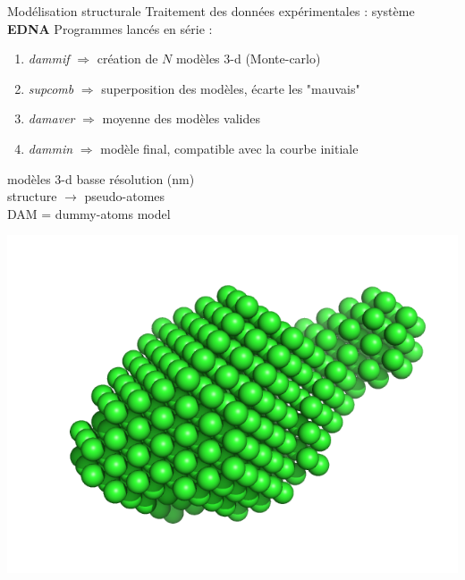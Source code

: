 \documentclass{beamer}
\begin{document}
\begin{frame}{Mod\'elisation structurale}
Traitement des donn\'ees exp\'erimentales : syst\`eme \textbf{EDNA}
Programmes lanc\'es en s\'erie : 
\begin{enumerate}
  \item \textit{dammif} $\Rightarrow$ cr\'eation de $N$ mod\`eles 3-d 
    (Monte-carlo)
  \item \textit{supcomb} $\Rightarrow$ superposition des mod\`eles, \'ecarte 
    les "mauvais"
  \item \textit{damaver} $\Rightarrow$ moyenne des mod\`eles valides
  \item \textit{dammin} $\Rightarrow$ mod\`ele final, compatible avec la 
    courbe initiale
\end{enumerate}

\begin{minipage}{0.50\linewidth}
    mod\`eles 3-d basse r\'esolution (nm)\\
    structure $\rightarrow$ pseudo-atomes\\
    DAM = dummy-atoms model
\end{minipage}
\begin{minipage}{0.45\linewidth}
    \begin{center}
    \vspace{-0.3cm}
    \hspace{-0.4cm}
    \includegraphics[scale=0.3]{model.png}
    \end{center}
\end{minipage}

\end{frame}
\end{document}
